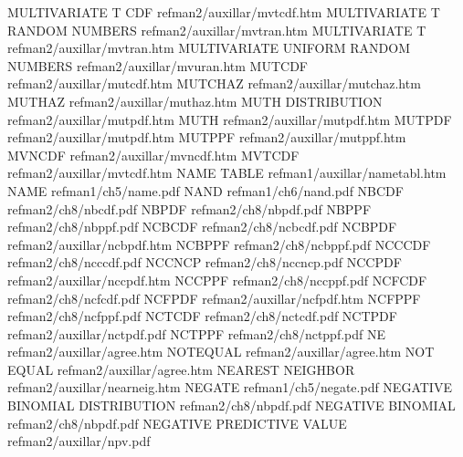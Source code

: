 MULTIVARIATE T CDF                      refman2/auxillar/mvtcdf.htm
MULTIVARIATE T RANDOM NUMBERS           refman2/auxillar/mvtran.htm
MULTIVARIATE T                          refman2/auxillar/mvtran.htm
MULTIVARIATE UNIFORM RANDOM NUMBERS     refman2/auxillar/mvuran.htm
MUTCDF                                  refman2/auxillar/mutcdf.htm
MUTCHAZ                                 refman2/auxillar/mutchaz.htm
MUTHAZ                                  refman2/auxillar/muthaz.htm
MUTH DISTRIBUTION                       refman2/auxillar/mutpdf.htm
MUTH                                    refman2/auxillar/mutpdf.htm
MUTPDF                                  refman2/auxillar/mutpdf.htm
MUTPPF                                  refman2/auxillar/mutppf.htm
MVNCDF                                  refman2/auxillar/mvncdf.htm
MVTCDF                                  refman2/auxillar/mvtcdf.htm
NAME TABLE                              refman1/auxillar/nametabl.htm
NAME                                    refman1/ch5/name.pdf
NAND                                    refman1/ch6/nand.pdf
NBCDF                                   refman2/ch8/nbcdf.pdf
NBPDF                                   refman2/ch8/nbpdf.pdf
NBPPF                                   refman2/ch8/nbppf.pdf
NCBCDF                                  refman2/ch8/ncbcdf.pdf
NCBPDF                                  refman2/auxillar/ncbpdf.htm
NCBPPF                                  refman2/ch8/ncbppf.pdf
NCCCDF                                  refman2/ch8/ncccdf.pdf
NCCNCP                                  refman2/ch8/nccncp.pdf
NCCPDF                                  refman2/auxillar/nccpdf.htm
NCCPPF                                  refman2/ch8/nccppf.pdf
NCFCDF                                  refman2/ch8/ncfcdf.pdf
NCFPDF                                  refman2/auxillar/ncfpdf.htm
NCFPPF                                  refman2/ch8/ncfppf.pdf
NCTCDF                                  refman2/ch8/nctcdf.pdf
NCTPDF                                  refman2/auxillar/nctpdf.pdf
NCTPPF                                  refman2/ch8/nctppf.pdf
NE                                      refman2/auxillar/agree.htm
NOTEQUAL                                refman2/auxillar/agree.htm
NOT EQUAL                               refman2/auxillar/agree.htm
NEAREST NEIGHBOR                        refman2/auxillar/nearneig.htm
NEGATE                                  refman1/ch5/negate.pdf
NEGATIVE BINOMIAL DISTRIBUTION          refman2/ch8/nbpdf.pdf
NEGATIVE BINOMIAL                       refman2/ch8/nbpdf.pdf
NEGATIVE PREDICTIVE VALUE               refman2/auxillar/npv.pdf
